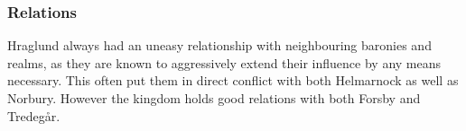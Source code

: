 \subsubsection{Relations}

Hraglund always had an uneasy relationship with neighbouring baronies
and realms, as they are known to aggressively extend their influence by any
means necessary. This often put them in direct conflict with both
Helmarnock as well as Norbury. However the kingdom holds good
relations with both Forsby and Tredegår.
